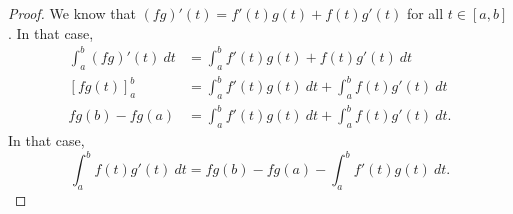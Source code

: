 \documentclass[a4paper, openany]{memoir}
\theoremstyle{definition}
\theoremstyle{plain}
\begin{document}
\begin{proof}
We know that $(fg)'(t) = f'(t)g(t) + f(t)g'(t)$ for all $t \in [a, b]$. In that case,
\begin{align*}
    \int_a^b (fg)'(t) \ dt &= \int_a^b f'(t)g(t) + f(t)g'(t) \ dt \\
    \left[fg(t)\right]_a^b &= \int_a^b f'(t)g(t) \ dt + \int_a^b f(t)g'(t) \ dt \\
    fg(b) - fg(a) &= \int_a^b f'(t)g(t) \ dt + \int_a^b f(t)g'(t) \ dt.
\end{align*}
In that case,
\[\int_a^b f(t) g'(t) \ dt = fg(b) - fg(a) - \int_a^b f'(t) g(t) \ dt.\]
\end{proof}
\end{document}
